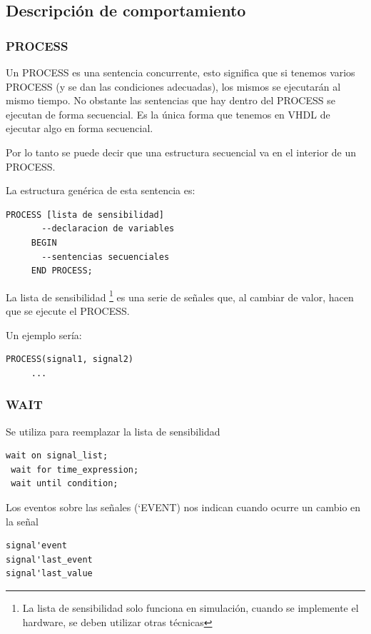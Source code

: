 \subsection{Descripción de comportamiento}
\subsubsection{PROCESS}
Un PROCESS es una sentencia concurrente, esto significa que si tenemos varios PROCESS (y se dan las condiciones adecuadas), los mismos 
se ejecutarán al mismo tiempo. No obstante las sentencias que hay dentro del PROCESS se ejecutan de forma secuencial. Es la única forma
que tenemos en VHDL de ejecutar algo en forma secuencial.

Por lo tanto se puede decir que una estructura secuencial va en el interior de un PROCESS.

La estructura genérica de esta sentencia es:

\begin{lstlisting}[style=vhdl]
 PROCESS [lista de sensibilidad]
       --declaracion de variables
     BEGIN
       --sentencias secuenciales
     END PROCESS;
\end{lstlisting}

La lista de sensibilidad \footnote{La lista de sensibilidad solo funciona en simulación, cuando se implemente el hardware, 
se deben utilizar otras técnicas} es una serie de señales que, al cambiar de valor, hacen que se ejecute el PROCESS.

Un ejemplo sería:

\begin{lstlisting}[style=vhdl]
 PROCESS(signal1, signal2)
     ...
\end{lstlisting}

\subsubsection{WAIT}
Se utiliza para reemplazar la lista de sensibilidad

\begin{lstlisting}[style=vhdl]
 wait on signal_list;
 wait for time_expression;
 wait until condition;
\end{lstlisting}

Los eventos sobre las señales (‘EVENT) nos indican cuando ocurre un cambio en la señal
\begin{lstlisting}[style=vhdl]
signal'event
signal'last_event
signal'last_value
\end{lstlisting}


